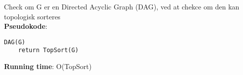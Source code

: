 Check om G er en Directed Acyclic Graph (DAG), ved at chekce om den kan topologisk sorteres\\
\textbf{Pseudokode}:
\begin{lstlisting}[frame=single, mathescape=true]
DAG(G)
	return TopSort(G)
\end{lstlisting}
\textbf{Running time}: O(TopSort)